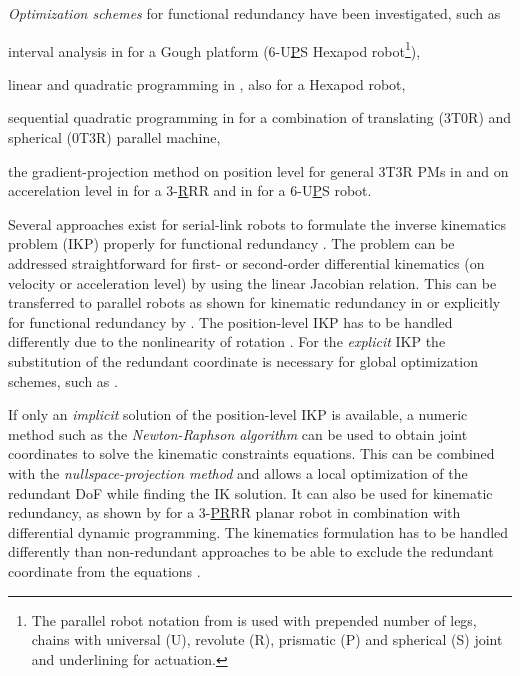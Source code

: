 \documentclass[
	graybox,
	vecphys] %
	{svmult}
\begin{document}
\emph{Optimization schemes} for functional redundancy have been investigated, such as
\begin{compactitem}
\item interval analysis in \cite{MerletPerDan2000} for a Gough platform (6-U\underline{P}S Hexapod robot\footnote{The parallel robot notation from \cite{Merlet2006} is used with prepended number of legs, chains with universal (U), revolute (R), prismatic (P) and spherical (S) joint and underlining for actuation.}), 
\item linear and quadratic programming in \cite{OenWan2007}, also for a Hexapod robot,
\item sequential quadratic programming in \cite{CorinaldiAngCal2016} for a combination of translating (3T0R) and spherical (0T3R) parallel machine,
\item the gradient-projection method on position level for general 3T3R PMs in \cite{SchapplerTapOrt2019} and on accerelation level in \cite{AgarwalNasBan2016} for a 3-\underline{R}RR and in \cite{SchapplerOrt2021} for a 6-U\underline{P}S robot.
\end{compactitem}

Several approaches exist for serial-link robots to formulate the inverse kinematics problem (IKP) properly for functional redundancy \cite{ReiterMueGat2018}.
The problem can be addressed straightforward for first- or second-order differential kinematics (on velocity or acceleration level) by using the linear Jacobian relation.
This can be transferred to parallel robots as shown for kinematic redundancy in \cite{GosselinSch2018} or explicitly for functional redundancy by \cite{AgarwalNasBan2016}.
The position-level IKP has to be handled differently due to the nonlinearity of rotation \cite{SchapplerTapOrt2019}.
For the \emph{explicit} IKP the substitution of the redundant coordinate is necessary for global optimization schemes, such as \cite{MerletPerDan2000}.

If only an \emph{implicit} solution of the position-level IKP is available, a numeric method such as the \emph{Newton-Raphson algorithm} can be used to obtain joint coordinates to solve the kinematic constraints equations.
This can be combined with the \emph{nullspace-projection method} and allows a local optimization of the redundant DoF while finding the IK solution.
It can also be used for kinematic redundancy, as shown by \cite{SantosSil2017} for a 3-\underline{PR}RR planar robot in combination with differential dynamic programming.
The kinematics formulation has to be handled differently than non-redundant approaches \cite{Merlet2006} to be able to exclude the redundant coordinate from the equations \cite{SchapplerTapOrt2019}.
\end{document}
